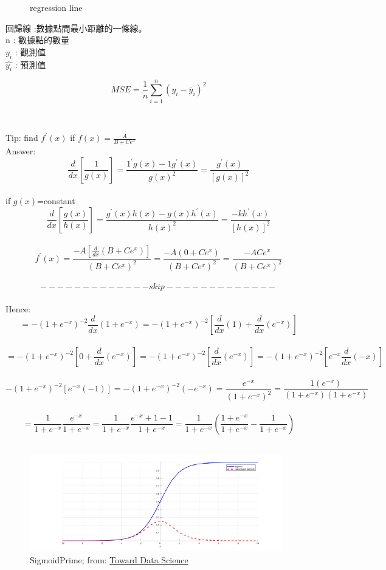 \documentclass[14pt,a4paper]{report}  %
\begin{document}
\begin{itemize}
\begin{figure}
\caption{regression line}
\end{figure}

回歸線 :數據點間最小距離的一條線。 \\
n : 數據點的數量\\
$y_i$ :  觀測值\\
$\hat{y_i}$ : 預測值\\
\begin{Large}
$$MSE=\frac{1}{n} \sum_{i=1}^n(y_i-\overline{y} _i)^2$$
\end{Large}\\[6pt]
\end{itemize}

\iffalse %
Tip: find $f^{'}(x)$ if $f(x)=\frac{A}{B+Ce^{x}}$\\
Answer:\\
$$\frac{d}{dx}[\frac{1}{g(x)}]=\frac{1^{'}g(x)-1g^{'}(x)}{g(x)^2}=\frac{g^{'}(x)}{[g(x)]^2}$$\\
if $g(x)$=constant\\
$$\frac{d}{dx}[\frac{g(x)}{h(x)}]=\frac{g^{'}(x)h(x)-g(x)h^{'}(x)}{h(x)^2}= \frac{-kh^{'}(x)}{[h(x)]^2}$$\\
$$f^{'}(x)=\frac{-A[\frac{d}{dx}(B+Ce^x)]}{(B+Ce^x)^2}=\frac{-A(0+Ce^x)}{(B+Ce^x)^2}=\frac{-ACe^x}{(B+Ce^x)^2}$$\\[6pt]
$$-------------skip-------------$$\\[6pt]
Hence:\\
$$=-(1+e^{-x})^{-2}\frac{d}{dx}(1+e^{-x})=-(1+e^{-x})^{-2}[\frac{d}{dx}(1)+\frac{d}{dx}(e^{-x})]$$\\
$$=-(1+e^{-x})^{-2}[0+\frac{d}{dx}(e^{-x})]=-(1+e^{-x})^{-2}[\frac{d}{dx}(e^{-x})]=-(1+e^{-x})^{-2}[e^{-x}\frac{d}{dx}(-x)]$$\\
$$-(1+e^{-x})^{-2}[e^{-x}(-1)]=-(1+e^{-x})^{-2}(-e^{-x})=\frac{e^{-x}}{(1+e^{-x})^2}=\frac{1(e^{-x})}{(1+e^{-x})(1+e^{-x})}$$\\
$$=\frac{1}{1+e^{-x}}\frac{e^{-x}}{1+e^{-x}}=\frac{1}{1+e^{-x}}\frac{e^{-x}+1-1}{1+e^{-x}}=\frac{1}{1+e^{-x}}(\frac{1+e^{-x}}{1+e^{-x}}-\frac{1}{1+e^{-x}})$$\\[6pt]


\begin{figure}[hbt!]
\begin{center}
\includegraphics[scale=0.80]{sigmoidprime}
\caption{SigmoidPrime; from: \href{https://towardsdatascience.com/derivative-of-the-sigmoid-function-536880cf918e}{Toward Data Science}}
\end{center}
\end{figure}
\end{document}
